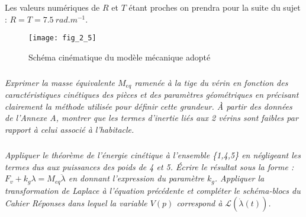 Les valeurs numériques de $R$ et $T$ étant proches on prendra pour la suite du sujet : $R = T = \SI{7,5}{rad.m^{-1}}$.



\begin{figure}[H]
\centering
\texttt{[image: fig\_2\_5]}
\label{fig_2_5}
\caption{Schéma cinématique du modèle mécanique adopté}
\end{figure}


\subparagraph{}
\textit{Exprimer la masse équivalente $M_{eq}$ ramenée à la tige du vérin en fonction des caractéristiques cinétiques des pièces et des paramètres géométriques en précisant clairement la méthode utilisée pour définir cette grandeur. À partir des données de l'Annexe A, montrer que les termes d'inertie liés aux 2 vérins sont faibles par rapport à celui associé à l'habitacle.}
\ifprof
\begin{corrige}
\end{corrige}
\else
\fi



\subparagraph{}
\textit{Appliquer le théorème de l'énergie cinétique à l'ensemble \{1,4,5\} en négligeant les termes dus aux puissances des poids de 4 et 5. Écrire le résultat sous la forme :
 $F_v + k_g \lambda = M_{eq} \ddot{\lambda}$ 
en donnant l'expression du paramètre $k_g$. Appliquer la transformation de Laplace à l'équation précédente et compléter le schéma-blocs du Cahier Réponses dans lequel la variable $V(p)$ correspond à  $\mathcal{L}\left(\dot{\lambda}(t)\right)$.}
\ifprof
\begin{corrige}
\end{corrige}
\else
\fi
